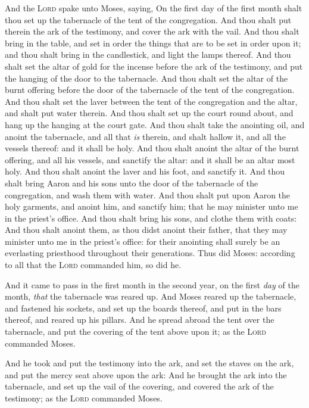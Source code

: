 \documentclass[11pt,letterpaper,oneside]{memoir}
\begin{document}
And the \textsc{Lord} spake unto Moses, saying, On the first day of the
first month shalt thou set up the tabernacle of the tent of the
congregation. And thou shalt put therein the ark of the testimony, and
cover the ark with the vail. And thou shalt bring in the table, and set
in order the things that are to be set in order upon it; and thou shalt
bring in the candlestick, and light the lamps thereof. And thou shalt
set the altar of gold for the incense before the ark of the testimony,
and put the hanging of the door to the tabernacle. And thou shalt set
the altar of the burnt offering before the door of the tabernacle of the
tent of the congregation. And thou shalt set the laver between the tent
of the congregation and the altar, and shalt put water therein. And thou
shalt set up the court round about, and hang up the hanging at the court
gate. And thou shalt take the anointing oil, and anoint the tabernacle,
and all that \emph{is} therein, and shalt hallow it, and all the vessels
thereof: and it shall be holy. And thou shalt anoint the altar of the
burnt offering, and all his vessels, and sanctify the altar: and it
shall be an altar most holy. And thou shalt anoint the laver and his
foot, and sanctify it. And thou shalt bring Aaron and his sons unto the
door of the tabernacle of the congregation, and wash them with water.
And thou shalt put upon Aaron the holy garments, and anoint him, and
sanctify him; that he may minister unto me in the priest's office. And
thou shalt bring his sons, and clothe them with coats: And thou shalt
anoint them, as thou didst anoint their father, that they may minister
unto me in the priest's office: for their anointing shall surely be an
everlasting priesthood throughout their generations. Thus did Moses:
according to all that the \textsc{Lord} commanded him, so did he.

And it came to pass in the first month in the second year, on the first
\emph{day} of the month, \emph{that} the tabernacle was reared up. And
Moses reared up the tabernacle, and fastened his sockets, and set up the
boards thereof, and put in the bars thereof, and reared up his pillars.
And he spread abroad the tent over the tabernacle, and put the covering
of the tent above upon it; as the \textsc{Lord} commanded Moses.

And he took and put the testimony into the ark, and set the staves on
the ark, and put the mercy seat above upon the ark: And he brought the
ark into the tabernacle, and set up the vail of the covering, and
covered the ark of the testimony; as the \textsc{Lord} commanded Moses.
\end{document}
